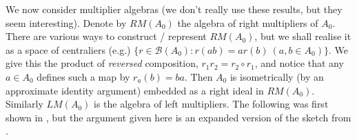 \documentclass[a4paper,11pt]{article}
\theoremstyle{plain}
\theoremstyle{remark}
\newcommand{\mc}[1]{\mathcal{#1}}
\begin{document}
We now consider multiplier algebras (we don't really use these results, but they seem interesting).  Denote by $RM(A_0)$ the algebra of right multipliers of $A_0$.  There are various ways to construct / represent $RM(A_0)$, but we shall realise it as a space of centraliers (e.g.\@ \cite[Section~3.12]{PedersenBook}) $\{ r \in\mc B(A_0) : r(ab) = ar(b) \ (a,b\in A_0) \}$.  We give this the product of \emph{reversed} composition, $r_1 r_2 = r_2 \circ r_1$, and notice that any $a\in A_0$ defines such a map by $r_a(b) = ba$.  Then $A_0$ is isometrically (by an approximate identity argument) embedded as a right ideal in $RM(A_0)$.  Similarly $LM(A_0)$ is the algebra of left multipliers.  The following was first shown in \cite[Theorem~1.5]{Lin_ModMapsandCP}, but the argument given here is an expanded version of the sketch from \cite{Schweizer_HilbModsPredual}.
\end{document}
